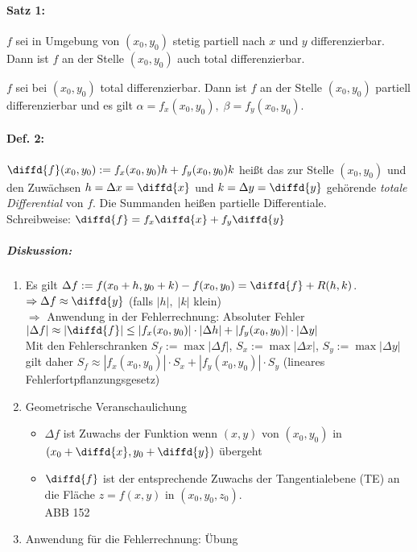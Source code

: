 \paragraph{Satz 1:}
\begin{anumerate}
\item $f$ sei in Umgebung von $(x_0, y_0)$ stetig partiell nach $x$ und $y$ differenzierbar. Dann ist $f$ an der Stelle $(x_0,y_0)$ auch total differenzierbar.
\item $f$ sei bei $(x_0,y_0)$ total differenzierbar. Dann ist $f$ an der Stelle $(x_0,y_0)$ partiell differenzierbar und es gilt $\alpha = f_x(x_0,y_0), \; \beta = f_y(x_0,y_0)$.
\end{anumerate}

\paragraph{Def. 2:} $\diffd{f}(x_0,y_0):=f_x(x_0,y_0)h+f_y(x_0,y_0)k$ heißt das zur Stelle $(x_0,y_0)$ und den Zuwächsen $h=\Delta x = \diffd{x}$ und $k=\Delta y = \diffd{y}$ gehörende \emph{totale Differential} von $f$. Die Summanden heißen partielle Differentiale.\\
Schreibweise: $\diffd{f}=f_x \diffd{x}+f_y\diffd{y}$
\subparagraph{Diskussion:} 
\begin{enumerate}
\item Es gilt $\Delta f := f(x_0+h, y_0+k) - f(x_0,y_0) = \diffd{f}+R(h,k)$.\\
$\Rightarrow \Delta f \approx \diffd{y}$ (falls $|h|, \; |k|$ klein)\\
$\Rightarrow$ Anwendung in der Fehlerrechnung: Absoluter Fehler\\
$|\Delta f| \approx | \diffd{f}| \leq |f_x(x_0,y_0)| \cdot |\Delta h| + |f_y(x_0,y_0)|\cdot |\Delta y|$\\
Mit den Fehlerschranken $S_f:=\max|\Delta f|$, $S_x:=\max|\Delta x|$, $S_y:=\max|\Delta y|$ gilt daher $S_f\approx |f_x(x_0,y_0)| \cdot  S_x + |f_y(x_0,y_0)| \cdot  S_y$ (lineares Fehlerfortpflanzungsgesetz)
\item Geometrische Veranschaulichung
\begin{itemize}
\item $\Delta f$ ist Zuwachs der Funktion wenn $(x,y)$ von $(x_0,y_0)$ in $(x_0+\diffd{x}, y_0 + \diffd{y})$ übergeht
\item $\diffd{f}$ ist der entsprechende Zuwachs der Tangentialebene (TE) an die Fläche $z=f(x,y)$ in $(x_0,y_0, z_0)$.\\
ABB 152
\end{itemize}
\item Anwendung für die Fehlerrechnung: Übung
\end{enumerate}

